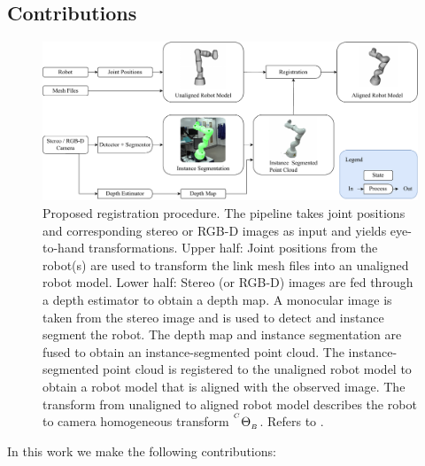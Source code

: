 \subsection{Contributions}
\begin{figure}[tb]
    \centering
    \includegraphics[width=\textwidth]{chapter_1/fig/approach_refined.pdf}
    \caption{Proposed registration procedure. The pipeline takes joint positions and corresponding stereo or RGB-D images as input and yields eye-to-hand transformations. Upper half: Joint positions from the robot(s) are used to transform the link mesh files into an unaligned robot model. Lower half: Stereo (or RGB-D) images are fed through a depth estimator to obtain a depth map. A monocular image is taken from the stereo image and is used to detect and instance segment the robot. The depth map and instance segmentation are fused to obtain an instance-segmented point cloud. The instance-segmented point cloud is registered to the unaligned robot model to obtain a robot model that is aligned with the observed image. The transform from unaligned to aligned robot model describes the robot to camera homogeneous transform ${}^{^C}\Theta_{_B}$. Refers to .}
    \label{c1:fig:calibration_pipeline}
\end{figure}
In this work we make the following contributions:
